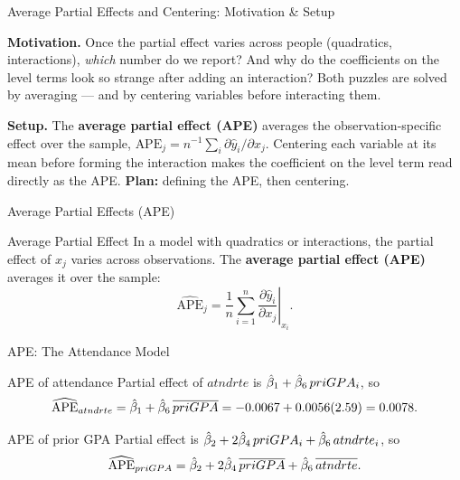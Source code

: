 \documentclass[aspectratio=169, 12pt]{beamer}
\begin{document}
\begin{frame}{Average Partial Effects and Centering: Motivation \& Setup}

  \begin{highlightbox}
    \textbf{Motivation.} Once the partial effect varies across people (quadratics,
    interactions), \emph{which} number do we report? And why do the coefficients on the
    level terms look so strange after adding an interaction? Both puzzles are solved by
    averaging --- and by centering variables before interacting them.
  \end{highlightbox}

  \begin{keybox}
    \textbf{Setup.} The \textbf{average partial effect (APE)} averages the
    observation-specific effect over the sample,
    $\text{APE}_j = n^{-1}\sum_i \partial \hat y_i / \partial x_j$. Centering each
    variable at its mean before forming the interaction makes the coefficient on the
    level term read directly as the APE. \textbf{Plan:} defining the APE, then
    centering.
  \end{keybox}

\end{frame}

\begin{frame}{Average Partial Effects (APE)}

  \begin{definitionbox}{Average Partial Effect}
    In a model with quadratics or interactions, the partial effect of $x_j$ varies
    across observations. The \textbf{average partial effect (APE)} averages it over the
    sample:
    \[
      \widehat{\text{APE}}_j = \frac{1}{n} \sum_{i=1}^{n}
      \left. \frac{\partial \hat{y}_i}{\partial x_j} \right|_{x_i} .
    \]
  \end{definitionbox}

\end{frame}

\begin{frame}{APE: The Attendance Model}

  \begin{examplebox}{APE of attendance}
    Partial effect of $atndrte$ is $\hat{\beta}_1 + \hat{\beta}_6\, priGPA_i$, so
    \[
      \widehat{\text{APE}}_{atndrte} = \hat{\beta}_1 + \hat{\beta}_6\, \overline{priGPA}
        = -0.0067 + 0.0056(2.59) = 0.0078 .
    \]
  \end{examplebox}

  \medskip

  \begin{examplebox}{APE of prior GPA}
    Partial effect is $\hat{\beta}_2 + 2\hat{\beta}_4\, priGPA_i + \hat{\beta}_6\, atndrte_i$, so
    \[
      \widehat{\text{APE}}_{priGPA} = \hat{\beta}_2 + 2\hat{\beta}_4\, \overline{priGPA}
        + \hat{\beta}_6\, \overline{atndrte} .
    \]
  \end{examplebox}

\end{frame}
\end{document}
